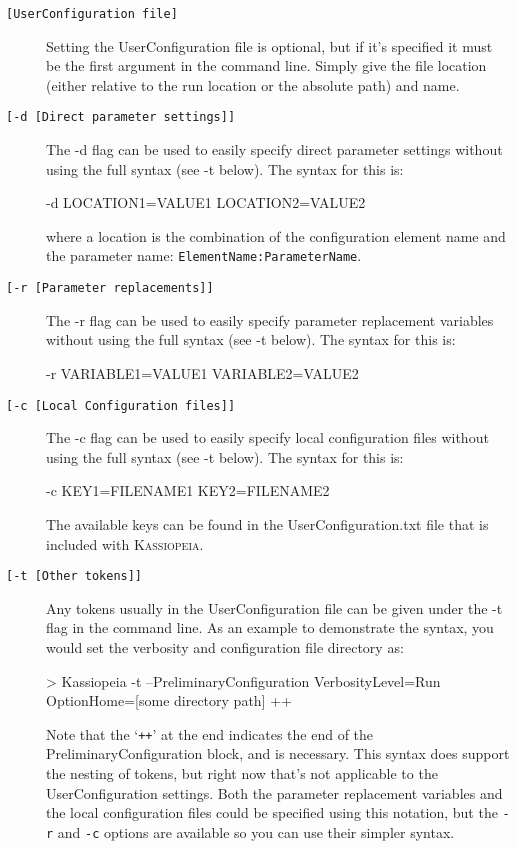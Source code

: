 \begin{description}
	\item[\texttt{[UserConfiguration file]}] Setting the UserConfiguration file is optional, but if it's specified it must be the first argument in the command line.  Simply give the file location (either relative to the run location or the absolute path) and name.
	\item[\texttt{[-d [Direct parameter settings]]}] The -d flag can be used to easily specify direct parameter settings without using the full syntax (see -t below).  The syntax for this is:
	\begin{DoxyCode}
	-d LOCATION1=VALUE1 LOCATION2=VALUE2
	\end{DoxyCode}
	where a location is the combination of the configuration element name and the parameter name: \texttt{ElementName:ParameterName}.
	\item[\texttt{[-r [Parameter replacements]]}] The -r flag can be used to easily specify parameter replacement variables without using the full syntax (see -t below).  The syntax for this is:
	\begin{DoxyCode}
	-r VARIABLE1=VALUE1 VARIABLE2=VALUE2
	\end{DoxyCode}
	\item[\texttt{[-c [Local Configuration files]]}] The -c flag can be used to easily specify local configuration files without using the full syntax (see -t below).  The syntax for this is:
	\begin{DoxyCode}
	-c KEY1=FILENAME1 KEY2=FILENAME2
	\end{DoxyCode}
	The available keys can be found in the UserConfiguration.txt file that is included with \textsc{Kassiopeia}.
	\item[\texttt{[-t [Other tokens]]}] Any tokens usually in the UserConfiguration file can be given under the -t flag in the command line. As an example to demonstrate the syntax, you would set the verbosity and configuration file directory as:
	\begin{DoxyCode}
	>  Kassiopeia -t --PreliminaryConfiguration VerbosityLevel=Run 
	OptionHome=[some directory path] ++
	\end{DoxyCode}
	Note that the `\texttt{++}' at the end indicates the end of the PreliminaryConfiguration block, and is necessary.  This syntax does support the nesting of tokens, but right now that's not applicable to the UserConfiguration settings.  Both the parameter replacement variables and the local configuration files could be specified using this notation, but the \texttt{-r} and \texttt{-c} options are available so you can use their simpler syntax.
\end{description}

